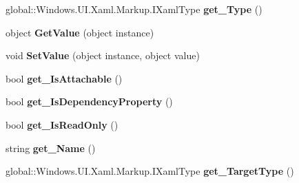 \begin{DoxyCompactItemize}
global\+::\+Windows.\+U\+I.\+Xaml.\+Markup.\+I\+Xaml\+Type {\bfseries get\+\_\+\+Type} ()
\item 
\mbox{\label{interface_windows_1_1_u_i_1_1_xaml_1_1_markup_1_1_i_xaml_member_a6045d32112170a1fabf61d95c491e662}} 
object {\bfseries Get\+Value} (object instance)
\item 
\mbox{\label{interface_windows_1_1_u_i_1_1_xaml_1_1_markup_1_1_i_xaml_member_a226214a27d7755b22726eae10b5a0e5d}} 
void {\bfseries Set\+Value} (object instance, object value)
\item 
\mbox{\label{interface_windows_1_1_u_i_1_1_xaml_1_1_markup_1_1_i_xaml_member_ac855440da9c4841678a59897db19929b}} 
bool {\bfseries get\+\_\+\+Is\+Attachable} ()
\item 
\mbox{\label{interface_windows_1_1_u_i_1_1_xaml_1_1_markup_1_1_i_xaml_member_a50958c2811365feb176ce13ae20278ff}} 
bool {\bfseries get\+\_\+\+Is\+Dependency\+Property} ()
\item 
\mbox{\label{interface_windows_1_1_u_i_1_1_xaml_1_1_markup_1_1_i_xaml_member_a64e363910e30966bb022436ab605d421}} 
bool {\bfseries get\+\_\+\+Is\+Read\+Only} ()
\item 
\mbox{\label{interface_windows_1_1_u_i_1_1_xaml_1_1_markup_1_1_i_xaml_member_a06de86d2ce3318ed9cf8e4668e6ba68e}} 
string {\bfseries get\+\_\+\+Name} ()
\item 
\mbox{\label{interface_windows_1_1_u_i_1_1_xaml_1_1_markup_1_1_i_xaml_member_a0d512a4a88e0b04167045265dbbbf5f5}} 
global\+::\+Windows.\+U\+I.\+Xaml.\+Markup.\+I\+Xaml\+Type {\bfseries get\+\_\+\+Target\+Type} ()
\item 
\mbox{\label{interface_windows_1_1_u_i_1_1_xaml_1_1_markup_1_1_i_xaml_member_aaba5576e9539838dda007eb5faaf0fd2}} 

\end{DoxyCompactItemize}
